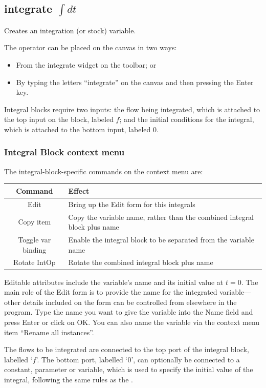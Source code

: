 \subsection{integrate $\int dt$}

\label{IntOp} Creates an integration (or stock) variable.


The operator can be placed on the canvas in two ways:
\begin{itemize}
\item From the integrate widget  on the
toolbar; or 
\item By typing the letters ``integrate'' on the canvas and then pressing
the Enter key.
\end{itemize}
Integral blocks require two inputs: the flow being integrated, which
is attached to the top input on the block, labeled $f$; and the
initial conditions for the integral, which is attached to the bottom
input, labeled $0$.

\subsubsection{Integral Block context menu}

The integral-block-specific commands on the context menu are:

\noindent\begin{tabular}{|c|p{}|}
\hline 
Command & Effect\tabularnewline
\hline 
\hline 
Edit & Bring up the Edit form for this integrals\tabularnewline
\hline 
Copy item & Copy the variable name, rather than the combined integral block plus
name\tabularnewline
\hline 
Toggle var binding & Enable the integral block to be separated from the variable name\tabularnewline
\hline 
Rotate IntOp & Rotate the combined integral block plus name\tabularnewline
\hline 
\end{tabular}

Editable attributes include the variable's name and its initial value
at $t=0$. The main role of the Edit form is to provide the name for
the integrated variable---other details included on the form can
be controlled from elsewhere in the program. Type the name you want
to give the variable into the Name field and press Enter or click
on OK. You can also name the variable via the context menu item ``Rename
all instances''.

The flows to be integrated are connected to the top port of the integral
block, labelled `$f$'. The bottom port, labelled `0', can optionally
be connected to a constant, parameter or variable, which is used to
specify the initial value of the integral, following the same rules as
the .

